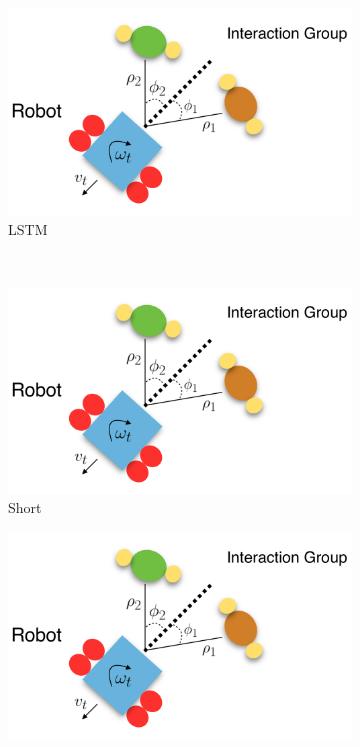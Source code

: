 \documentclass[letterpaper, 10 pt, conference]{ieeeconf}
\begin{document}
\begin{figure}[tbh]
\begin{subfigure}[b]{0.45\columnwidth}
    \includegraphics[scale = 0.22]{images/data.png}
    \caption{LSTM}
       \label{fig:robot}
  \end{subfigure} 
  \\
        \begin{subfigure}[b]{0.45\columnwidth}
    \includegraphics[scale = 0.22]{images/data.png}
    \caption{Short}
    \label{fig:data}
  \end{subfigure}
  \hspace{4mm}
  \begin{subfigure}[b]{0.45\columnwidth}
    \includegraphics[scale = 0.22]{images/data.png}


\end{subfigure}
\end{figure}
\end{document}
